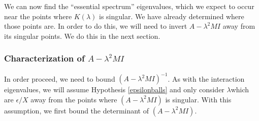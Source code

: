 \documentclass[12pt]{article}
\begin{document}
We can now find the ``essential spectrum'' eigenvalues, which we expect to occur near the points where $K(\lambda)$ is singular. We have already determined where those points are. In order to do this, we will need to invert $A - \lambda^2 MI$ away from its singular points. We do this in the next section.

\subsubsection{Characterization of \texorpdfstring{$A - \lambda^2 MI$}{Matrix A} }

In order proceed, we need to bound $(A - \lambda^2 MI)^{-1}$. As with the interaction eigenvalues, we will assume Hypothesis \ref{epsilonballs} and only consider $\lambda$which are $\epsilon/X$ away from the points where $(A - \lambda^2 MI)$ is singular. With this assumption, we first bound the determinant of $(A - \lambda^2 MI)$.

\end{document}
